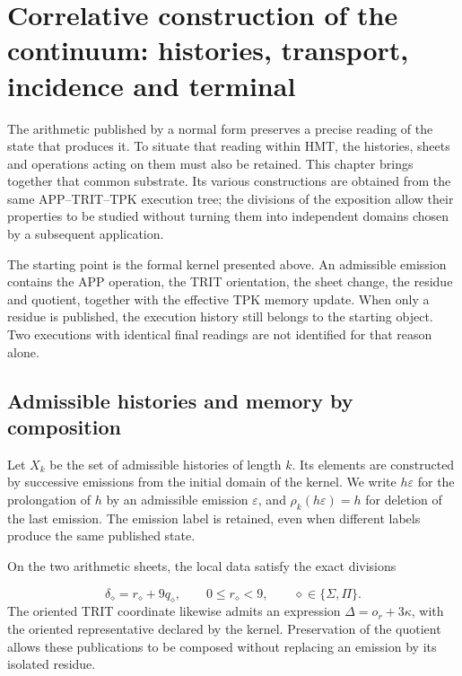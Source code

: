 \section{Correlative construction of the continuum: histories, transport, incidence and terminal}
\label{viii:lectura:manuscrito-05}
The arithmetic published by a normal form preserves a precise reading of the state that produces it. To situate that reading within HMT, the histories, sheets and operations acting on them must also be retained. This chapter brings together that common substrate. Its various constructions are obtained from the same APP–TRIT–TPK execution tree; the divisions of the exposition allow their properties to be studied without turning them into independent domains chosen by a subsequent application.

The starting point is the formal kernel presented above. An admissible emission contains the APP operation, the TRIT orientation, the sheet change, the residue and quotient, together with the effective TPK memory update. When only a residue is published, the execution history still belongs to the starting object. Two executions with identical final readings are not identified for that reason alone.

\subsection{Admissible histories and memory by composition}
Let \(X_k\) be the set of admissible histories of length \(k\). Its elements are constructed by successive emissions from the initial domain of the kernel. We write \(h\varepsilon\) for the prolongation of \(h\) by an admissible emission \(\varepsilon\), and \(\rho_k(h\varepsilon)=h\) for deletion of the last emission. The emission label is retained, even when different labels produce the same published state.

On the two arithmetic sheets, the local data satisfy the exact divisions

\[
\delta_\diamond=r_\diamond+9q_\diamond,
\qquad 0\leq r_\diamond<9,
\qquad \diamond\in\{\Sigma,\Pi\}.
\]
The oriented TRIT coordinate likewise admits an expression \(\Delta=o_r+3\kappa\), with the oriented representative declared by the kernel. Preservation of the quotient allows these publications to be composed without replacing an emission by its isolated residue.

